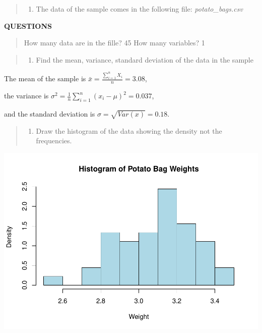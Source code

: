\documentclass[
]{article}
\providecommand{\tightlist}{%
  \setlength{\itemsep}{0pt}\setlength{\parskip}{0pt}}
\begin{document}
\begin{quote}
\begin{enumerate}
\def\labelenumi{\arabic{enumi}.}
\tightlist
\item
  The data of the sample comes in the following file:
  \emph{potato\_bags.csv}
\end{enumerate}
\end{quote}

\textbf{QUESTIONS}

\begin{quote}
How many data are in the fille? 45 How many variables? 1
\end{quote}

\begin{quote}
\begin{enumerate}
\def\labelenumi{\arabic{enumi}.}
\setcounter{enumi}{1}
\tightlist
\item
  Find the mean, variance, standard deviation of the data in the sample
\end{enumerate}
\end{quote}

\begin{quote}
\end{quote}

The mean of the sample is
\(\bar{x} = \frac{\sum_{i=1}^{n}{X_i}}{n} = 3.08\),

the variance is
\(\sigma^{2} = \frac{1}{n}\sum_{i=1}^{n}{(x_i - \mu)^2} = 0.037\),

and the standard deviation is \(\sigma = \sqrt{Var(x)} = 0.18\).

\begin{quote}
\end{quote}

\begin{quote}
\begin{enumerate}
\def\labelenumi{\arabic{enumi}.}
\setcounter{enumi}{2}
\tightlist
\item
  Draw the histogram of the data showing the density not the
  frequencies.
\end{enumerate}
\end{quote}

\includegraphics{final_work_stu_files/figure-latex/unnamed-chunk-3-1.pdf}
\end{document}
